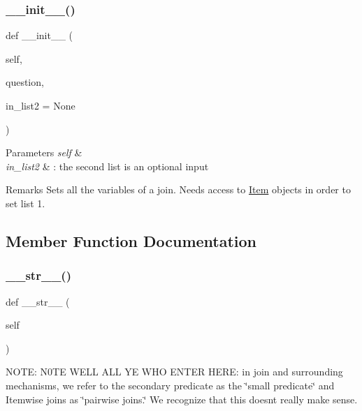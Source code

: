 \subsubsection{\texorpdfstring{\+\_\+\+\_\+init\+\_\+\+\_\+()}{\_\_init\_\_()}}
{\footnotesize\ttfamily def \+\_\+\+\_\+init\+\_\+\+\_\+ (\begin{DoxyParamCaption}\item[{}]{self,  }\item[{}]{question,  }\item[{}]{in\+\_\+list2 = {\ttfamily None} }\end{DoxyParamCaption})}


\begin{DoxyParams}{Parameters}
{\em self} & \\
\hline
{\em in\+\_\+list2} & \+: the second list is an optional input \\
\hline
\end{DoxyParams}
\begin{DoxyRemark}{Remarks}
Sets all the variables of a join. Needs access to \hyperlink{classdynamicfilterapp_1_1models_1_1_item}{Item} objects in order to set list 1. 
\end{DoxyRemark}


\subsection{Member Function Documentation}
\mbox{\label{classdynamicfilterapp_1_1models_1_1_join_a23e8041ce1015febe4fdace3225714f9}} 
\subsubsection{\texorpdfstring{\+\_\+\+\_\+str\+\_\+\+\_\+()}{\_\_str\_\_()}}
{\footnotesize\ttfamily def \+\_\+\+\_\+str\+\_\+\+\_\+ (\begin{DoxyParamCaption}\item[{}]{self }\end{DoxyParamCaption})}



N\+O\+TE\+: N0\+TE W\+E\+LL A\+LL YE W\+HO E\+N\+T\+ER H\+E\+RE\+: in join and surrounding mechanisms, we refer to the secondary predicate as the \char`\"{}small predicate\char`\"{} and Itemwise joins as \char`\"{}pairwise joins.\char`\"{} We recognize that this doesn\textquotesingle{}t really make sense. 

